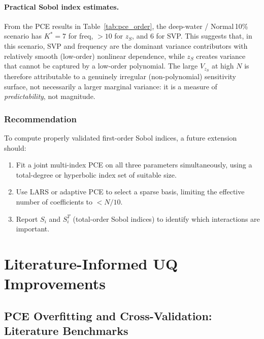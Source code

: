 \documentclass[11pt,a4paper]{article}
\begin{document}
\paragraph{Practical Sobol index estimates.}
From the PCE results in Table~\ref{tab:pce_order}, the deep-water / Normal\,10\%
scenario has $K^* = 7$ for freq, $>10$ for $z_S$, and $6$ for SVP.
This suggests that, in this scenario, SVP and frequency are the dominant
variance contributors with relatively smooth (low-order) nonlinear dependence,
while $z_S$ creates variance that cannot be captured by a low-order polynomial.
The large $V_{z_S}$ at high $N$ is therefore attributable to a genuinely
irregular (non-polynomial) sensitivity surface, not necessarily a larger
marginal variance: it is a measure of \emph{predictability}, not magnitude.

\subsubsection{Recommendation}

To compute properly validated first-order Sobol indices, a future extension should:
\begin{enumerate}
  \item Fit a joint multi-index PCE on all three parameters simultaneously, using
        a total-degree or hyperbolic index set of suitable size.
  \item Use LARS or adaptive PCE to select a sparse basis, limiting the effective
        number of coefficients to $< N/10$.
  \item Report $S_i$ and $S_i^T$ (total-order Sobol indices) to identify which
        interactions are important.
\end{enumerate}

\section{Literature-Informed UQ Improvements}
\label{sec:lit_improvements}

\subsection{PCE Overfitting and Cross-Validation: Literature Benchmarks}
\label{sec:cv_lit}
\end{document}
